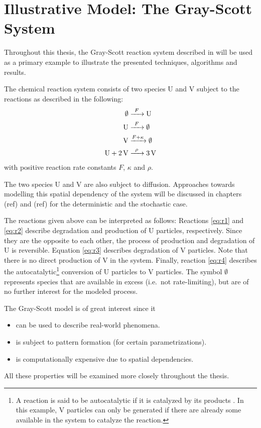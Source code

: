 \section{Illustrative Model: The Gray-Scott System}
Throughout this thesis, the Gray-Scott reaction system described in \cite{pearson_complex_1993} will be used as a primary example to illustrate the presented techniques, algorithms and results. 

The chemical reaction system consists of two species U and V subject to the reactions as described in the following: \\
\begin{align}
\label{eq:r1}
\cee{\emptyset{} &->[F] U} \\
\label{eq:r2}
\cee{U &->[F] \emptyset} \\
\label{eq:r3}
\cee{V &->[F+\kappa] \emptyset} \\
\label{eq:r4}
\cee{U + 2V &->[\rho] 3V}
\end{align}
with positive reaction rate constants $F$, $\kappa$ and $\rho$.

The two species U and V are also subject to diffusion. Approaches towards modelling this spatial dependency of the system will be discussed in chapters (ref) and (ref) for the deterministic and the stochastic case. 

The reactions given above can be interpreted as follows: Reactions \eqref{eq:r1} and \eqref{eq:r2} describe degradation and production of U particles, respectively. Since they are the opposite to each other, the process of production and degradation of U is reversible. Equation \eqref{eq:r3} describes degradation of V particles. Note that there is no direct production of V in the system. Finally, reaction \eqref{eq:r4} describes the autocatalytic\footnote{A reaction is said to be autocatalytic if it is catalyzed by its products \cite[pg.\ 907]{atkins_physical_2009}. In this example, V particles can only be generated if there are already some available in the system to catalyze the reaction.} conversion of U particles to V particles. The symbol $\emptyset$ represents species that are available in excess (i.e.\ not rate-limiting), but are of no further interest for the modeled process. 

The Gray-Scott model is of great interest since it
\begin{itemize}
\item can be used to describe real-world phenomena.
\item is subject to pattern formation (for certain parametrizations).
\item is computationally expensive due to spatial dependencies.
\end{itemize}
All these properties will be examined more closely throughout the thesis. 
%
%
%
%
%
%
%
%
\ifdebug

